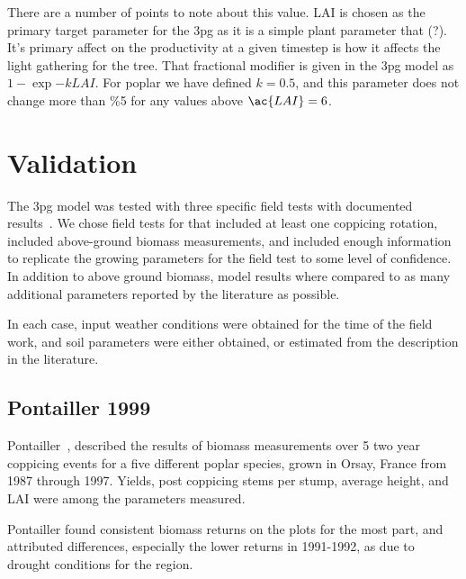\documentclass[10pt]{article}
\begin{document}
There are a number of points to note about this value.  \ac{LAI} is
chosen as the primary target parameter for the \ac{3pg} as it is a
simple plant parameter that (?).  It's primary affect on the
productivity at a given timestep is how it affects the light gathering
for the tree.  That fractional modifier is given in the \ac{3pg} model
as $1-\exp{-k LAI}$.  For poplar we have defined $k=0.5$, and this
parameter does not change more than \%5 for any values above
$\ac{LAI}=6$.


\section*{Validation}
\label{sec:validation}



The \ac{3pg} model was tested with three specific field tests with
documented results~\cite{Proe2002,Proe1999,Pontailler1999,Afas2008a}.
We chose field tests for \pop that included at least one coppicing
rotation, included above-ground biomass measurements, and included
enough information to replicate the growing parameters for the field
test to some level of confidence.  In addition to above ground
biomass, model results where compared to as many additional parameters
reported by the literature as possible.

In each case, input weather conditions were obtained for the time of
the field work, and soil parameters were either obtained, or estimated
from the description in the literature.

\subsection*{Pontailler 1999}
\label{sec:pont}

Pontailler~\cite{Pontailler1999}, described the results of biomass
measurements over 5 two year coppicing events for a five different
poplar species, grown in Orsay, France from 1987 through 1997.
Yields, post coppicing stems per stump, average height, and \ac{LAI}
were among the parameters measured.

Pontailler found consistent biomass returns on the plots for the most
part, and attributed differences, especially the lower returns in
1991-1992, as due to drought conditions for the region.  
\end{document}
